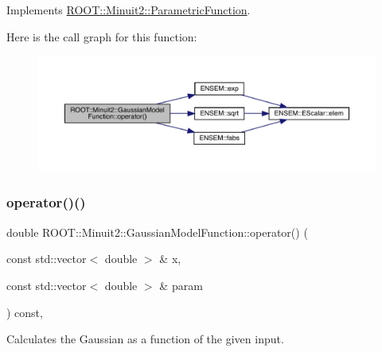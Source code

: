 Implements \mbox{\hyperlink{classROOT_1_1Minuit2_1_1ParametricFunction_a953426fa51c84cdef3eba24274131806}{R\+O\+O\+T\+::\+Minuit2\+::\+Parametric\+Function}}.

Here is the call graph for this function\+:
\nopagebreak
\begin{figure}[H]
\begin{center}
\leavevmode
\includegraphics[width=350pt]{d4/df6/classROOT_1_1Minuit2_1_1GaussianModelFunction_af4102c5eecd496d63c5592f7519248ce_cgraph}
\end{center}
\end{figure}
\mbox{\label{classROOT_1_1Minuit2_1_1GaussianModelFunction_ab74ced8f50ef3831c8142de54877e726}} 
\subsubsection{\texorpdfstring{operator()()}{operator()()}\hspace{0.1cm}{\footnotesize\ttfamily [3/4]}}
{\footnotesize\ttfamily double R\+O\+O\+T\+::\+Minuit2\+::\+Gaussian\+Model\+Function\+::operator() (\begin{DoxyParamCaption}\item[{const std\+::vector$<$ double $>$ \&}]{x,  }\item[{const std\+::vector$<$ double $>$ \&}]{param }\end{DoxyParamCaption}) const\hspace{0.3cm}{\ttfamily [inline]}, {\ttfamily [virtual]}}

Calculates the Gaussian as a function of the given input.


